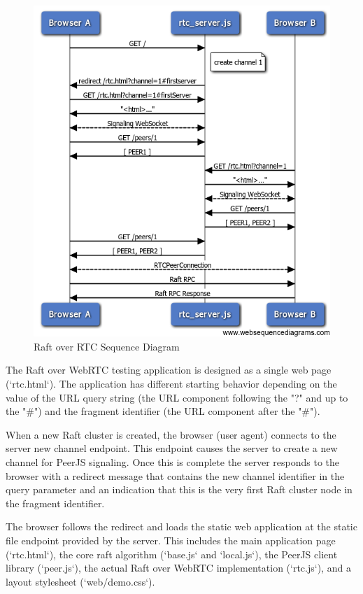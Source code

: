 \documentclass{acmtog} %
\begin{document}
\begin{figure}[Ht]
\centerline{\includegraphics[width=15cm]{raft_rtc_sequence}}
\caption{Raft over RTC Sequence Diagram}
  \label{fig:raft_rtc_sequence}
\end{figure}

The Raft over WebRTC testing application is designed as a single web
page (`rtc.html`). The application has different starting behavior
depending on the value of the URL query string (the URL component
following the "?" and up to the "\#") and the fragment identifier (the
URL component after the "\#").

When a new Raft cluster is created, the browser (user agent) connects
to the server new channel endpoint. This endpoint causes the server to
create a new channel for PeerJS signaling. Once this is complete the
server responds to the browser with a redirect message that contains
the new channel identifier in the query parameter and an indication
that this is the very first Raft cluster node in the fragment
identifier.

The browser follows the redirect and loads the static web application
at the static file endpoint provided by the server. This includes the
main application page (`rtc.html`), the core raft algorithm
(`base.js` and `local.js`), the PeerJS client library (`peer.js`), the
actual Raft over WebRTC implementation (`rtc.js`), and a layout
stylesheet (`web/demo.css`).
\end{document}

